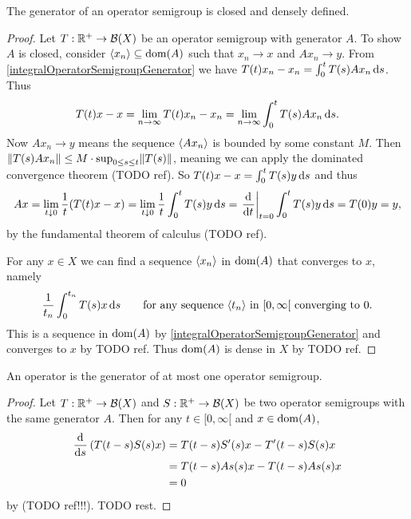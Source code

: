 \begin{proposition} \label{generatorClosedDenselyDefined}
The generator of an operator semigroup is closed and densely defined.
\end{proposition}
\begin{proof}
Let $T: \mathbb{R}^+\to \operatorname{\mathcal{B}}(X)$ be an operator semigroup with generator $A$. To show $A$ is closed, consider $\left\langle x_n \right\rangle\subseteq \operatorname{dom}(A)$ such that $x_n\to x$ and $Ax_n \to y$. From \ref{integralOperatorSemigroupGenerator} we have $T(t)x_n - x_n = \int_0^tT(s)Ax_n\operatorname{d \!}{s}$. Thus
\[ T(t)x-x = \lim_{n\to\infty} T(t)x_n - x_n = \lim_{n\to\infty} \int_0^tT(s)Ax_n\operatorname{d \!}{s}. \]
Now $Ax_n \to y$ means the sequence $\left\langle Ax_n \right\rangle$ is bounded by some constant $M$. Then $\lVert T(s)Ax_n\rVert \leq M\cdot\sup_{0\leq s \leq t}\lVert T(s)\rVert$, meaning we can apply the dominated convergence theorem (TODO ref). So $T(t)x-x = \int_0^tT(s)y\operatorname{d \!}{s}$ and thus
\[ Ax = \lim_{t\downarrow 0}\frac{1}{t}(T(t)x-x) = \lim_{t\downarrow 0}\frac{1}{t}\int_0^tT(s)y\operatorname{d \!}{s} = \left.\mathinner{ \dfrac{\operatorname{d \!}{^{}}}{\operatorname{d \!}{{t}^{}}} }\right|_{t=0}\int_0^tT(s)y\operatorname{d \!}{s} = T(0)y = y, \]
by the fundamental theorem of calculus (TODO ref).

For any $x\in X$ we can find a sequence $\left\langle x_n \right\rangle$ in $\operatorname{dom}(A)$ that converges to $x$, namely
\[ \frac{1}{t_n}\int^{t_n}_0T(s)x\operatorname{d \!}{s} \qquad \text{for any sequence $\left\langle t_n \right\rangle$ in $[0,\infty[$ converging to $0$.}  \]
This is a sequence in $\operatorname{dom}(A)$ by \ref{integralOperatorSemigroupGenerator} and converges to $x$ by TODO ref. Thus $\operatorname{dom}(A)$ is dense in $X$ by TODO ref.
\end{proof}

\begin{proposition}
An operator is the generator of at most one operator semigroup.
\end{proposition}
\begin{proof}
Let $T: \mathbb{R}^+\to \operatorname{\mathcal{B}}(X)$ and $S: \mathbb{R}^+\to \operatorname{\mathcal{B}}(X)$ be two operator semigroups with the same generator $A$. Then for any $t\in [0,\infty[$ and $x\in \operatorname{dom}(A)$,
\begin{align*}
\mathinner{ \dfrac{\operatorname{d \!}{^{}}}{\operatorname{d \!}{{s}^{}}} } \left(T(t-s)S(s)x\right) &= T(t-s)S'(s)x - T'(t-s)S(s)x \\
&= T(t-s)As(s)x - T(t-s)As(s)x \\
&= 0
\end{align*}
by (TODO ref!!!). TODO rest.
\end{proof}

